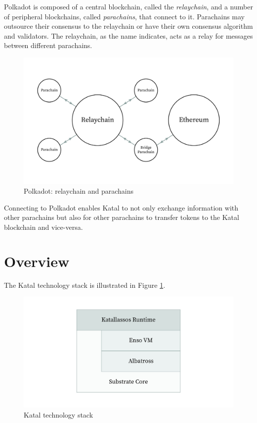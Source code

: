\documentclass[conference]{IEEEtran}
\begin{document}
Polkadot is composed of a central blockchain, called the \textit{relaychain}, and a number of peripheral blockchains, called \textit{parachains}, that connect to it. Parachains may outsource their consensus to the relaychain or have their own consensus algorithm and validators. The relaychain, as the name indicates, acts as a relay for messages between different parachains.

\begin{figure}[h]
	\includegraphics[width=\linewidth]{images/polkadot.jpg}
	\caption{Polkadot: relaychain and parachains}
\end{figure}

Connecting to Polkadot enables Katal to not only exchange information with other parachains but also for other parachains to transfer tokens to the Katal blockchain and vice-versa.

\section{Overview}
The Katal technology stack is illustrated in Figure \ref{fig:stack}.

\begin{figure}[h]
	\includegraphics[width=\linewidth]{images/KTS_stack.jpg}
	\caption{Katal technology stack}
	\label{fig:stack}
\end{figure}
\end{document}
